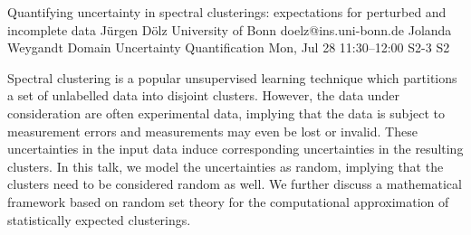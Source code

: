 \begin{talk}
\end{talk}

\begin{talk}
  {Quantifying uncertainty in spectral clusterings: expectations for perturbed and incomplete data}%
  {J\"urgen D\"olz}%
  {University of Bonn}%
  {doelz@ins.uni-bonn.de}%
  {Jolanda Weygandt}%
  {Domain Uncertainty Quantification}%
  {Mon, Jul 28 11:30--12:00}%
  {S2-3}%
  {S2}%
    
   
Spectral clustering is a popular unsupervised learning technique which partitions a set of unlabelled data into disjoint clusters. However, the data under consideration are often experimental data, implying that the data is subject to measurement errors and measurements may even be lost or invalid. These uncertainties in the input data induce corresponding uncertainties in the resulting clusters. In this talk, we model the uncertainties as random, implying that the clusters need to be considered random as well. We further discuss a mathematical framework based on random set theory for the computational approximation of statistically expected clusterings.
\end{talk}

